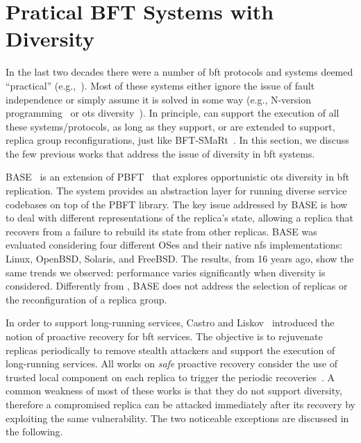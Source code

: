 \section{Pratical BFT Systems with Diversity}


In the last two decades there were a number of \gls{bft} protocols and systems deemed ``practical'' (e.g.,~\cite{Castro:2002,Kotla:2010,Veronese:2013,Aublin:2015,Behl:2015,Behl:2017,Liu:2016,Yin:2003}).
Most of these systems either ignore the issue of fault independence or simply assume it is solved in some way (e.g., N-version programming~\cite{Chen:1995} or \gls{ots} diversity~\cite{Gashi:2007,Garcia:2014}).
In principle, \system can support the execution of all these systems/protocols, as long as they support, or are extended to support, replica group reconfigurations, just like BFT-SMaRt~\cite{Bessani:2014}.
In this section, we discuss the few previous works that address the issue of diversity in \gls{bft} systems. 

BASE~\cite{Rodrigues:2001} is an extension of PBFT~\cite{Castro:1999} that explores opportunistic \gls{ots} diversity in \gls{bft} replication. 
The system provides an abstraction layer for running diverse service codebases on top of the PBFT library.
The key issue addressed by BASE is how to deal with different representations of the replica's state, allowing a replica that recovers from a failure to rebuild its state from other replicas. 
BASE was evaluated considering four different OSes and their native \gls{nfs} implementations: Linux, OpenBSD, Solaris, and FreeBSD.
The results, from 16 years ago, show the same trends we observed: performance varies significantly when diversity is considered.
Differently from \system, BASE does not address the selection of replicas or the reconfiguration of a replica group.

In order to support long-running services, Castro and Liskov~\cite{Castro:2002} introduced the notion of proactive recovery for \gls{bft} services. 
The objective is to rejuvenate replicas periodically to remove stealth attackers and support the execution of long-running services. 
All works on \emph{safe} proactive recovery consider the use of trusted local component on each replica to trigger the periodic recoveries~\cite{Castro:2002,Sousa:2010,Roeder:2010,Platania:2014,Distler:2011}.
A common weakness of most of these works is that they do not support diversity, therefore a compromised replica can be attacked immediately after its recovery by exploiting the same vulnerability.
The two noticeable exceptions are discussed in the following.

